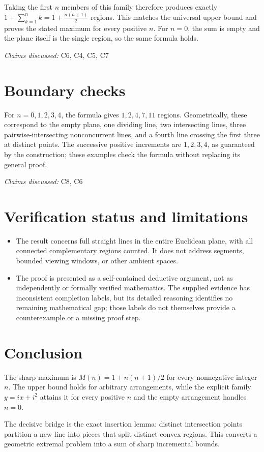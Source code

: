 \documentclass[11pt]{article}
\begin{document}
Taking the first $n$ members of this family therefore produces exactly
$1+\sum_{k=1}^{n}k=1+\frac{n(n+1)}{2}$
regions. This matches the universal upper bound and proves the stated maximum for every positive $n$. For $n=0$, the sum is empty and the plane itself is the single region, so the same formula holds.

\textit{Claims discussed: }C6, C4, C5, C7
\section{Boundary checks}
For $n=0,1,2,3,4$, the formula gives $1,2,4,7,11$ regions. Geometrically, these correspond to the empty plane, one dividing line, two intersecting lines, three pairwise-intersecting nonconcurrent lines, and a fourth line crossing the first three at distinct points. The successive positive increments are $1,2,3,4$, as guaranteed by the construction; these examples check the formula without replacing its general proof.

\textit{Claims discussed: }C8, C6
\section{Verification status and limitations}
\begin{itemize}
\item The result concerns full straight lines in the entire Euclidean plane, with all connected complementary regions counted. It does not address segments, bounded viewing windows, or other ambient spaces.
\item The proof is presented as a self-contained deductive argument, not as independently or formally verified mathematics. The supplied evidence has inconsistent completion labels, but its detailed reasoning identifies no remaining mathematical gap; those labels do not themselves provide a counterexample or a missing proof step.
\end{itemize}
\section{Conclusion}
The sharp maximum is $M(n)=1+n(n+1)/2$ for every nonnegative integer $n$. The upper bound holds for arbitrary arrangements, while the explicit family $y=ix+i^2$ attains it for every positive $n$ and the empty arrangement handles $n=0$.

The decisive bridge is the exact insertion lemma: distinct intersection points partition a new line into pieces that split distinct convex regions. This converts a geometric extremal problem into a sum of sharp incremental bounds.
\end{document}
